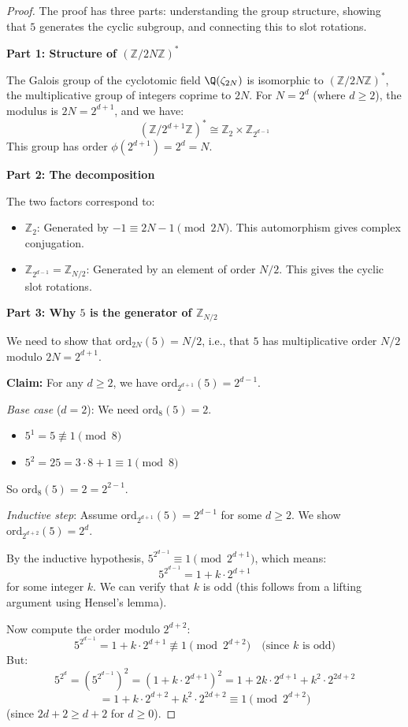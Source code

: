 \documentclass[11pt,a4paper]{article}
\newcommand{\Z}{\mathbb{Z}}
\begin{document}
\begin{proof}
The proof has three parts: understanding the group structure, showing that $5$ generates the cyclic subgroup, and connecting this to slot rotations.

\textbf{Part 1: Structure of $(\Z/2N\Z)^*$}

The Galois group of the cyclotomic field $\Q(\zeta_{2N})$ is isomorphic to $(\Z/2N\Z)^*$, the multiplicative group of integers coprime to $2N$. For $N = 2^d$ (where $d \geq 2$), the modulus is $2N = 2^{d+1}$, and we have:
\[
(\Z/2^{d+1}\Z)^* \cong \Z_2 \times \Z_{2^{d-1}}
\]
This group has order $\phi(2^{d+1}) = 2^d = N$.

\textbf{Part 2: The decomposition}

The two factors correspond to:
\begin{itemize}
    \item $\Z_2$: Generated by $-1 \equiv 2N-1 \pmod{2N}$. This automorphism gives complex conjugation.
    \item $\Z_{2^{d-1}} = \Z_{N/2}$: Generated by an element of order $N/2$. This gives the cyclic slot rotations.
\end{itemize}

\textbf{Part 3: Why $5$ is the generator of $\Z_{N/2}$}

We need to show that $\text{ord}_{2N}(5) = N/2$, i.e., that $5$ has multiplicative order $N/2$ modulo $2N = 2^{d+1}$.

\textbf{Claim:} For any $d \geq 2$, we have $\text{ord}_{2^{d+1}}(5) = 2^{d-1}$.

\textit{Base case} ($d = 2$): We need $\text{ord}_{8}(5) = 2$.
\begin{itemize}
    \item $5^1 = 5 \not\equiv 1 \pmod 8$
    \item $5^2 = 25 = 3 \cdot 8 + 1 \equiv 1 \pmod 8$ \checkmark
\end{itemize}
So $\text{ord}_8(5) = 2 = 2^{2-1}$.

\textit{Inductive step}: Assume $\text{ord}_{2^{d+1}}(5) = 2^{d-1}$ for some $d \geq 2$. We show $\text{ord}_{2^{d+2}}(5) = 2^d$.

By the inductive hypothesis, $5^{2^{d-1}} \equiv 1 \pmod{2^{d+1}}$, which means:
\[
5^{2^{d-1}} = 1 + k \cdot 2^{d+1}
\]
for some integer $k$. We can verify that $k$ is odd (this follows from a lifting argument using Hensel's lemma).

Now compute the order modulo $2^{d+2}$:
\[
5^{2^{d-1}} = 1 + k \cdot 2^{d+1} \not\equiv 1 \pmod{2^{d+2}} \quad \text{(since $k$ is odd)}
\]
But:
\[
5^{2^d} = (5^{2^{d-1}})^2 = (1 + k \cdot 2^{d+1})^2 = 1 + 2k \cdot 2^{d+1} + k^2 \cdot 2^{2d+2}
\]
\[
= 1 + k \cdot 2^{d+2} + k^2 \cdot 2^{2d+2} \equiv 1 \pmod{2^{d+2}}
\]
(since $2d + 2 \geq d + 2$ for $d \geq 0$).


\end{proof}
\end{document}

